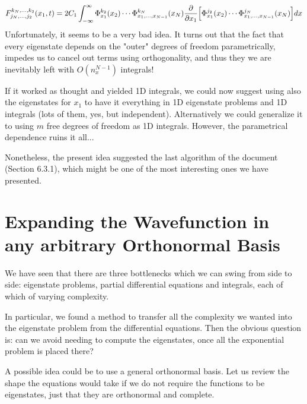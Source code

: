\documentclass[11pt, a4paper]{article} %
\begin{document}
\begin{equation}
F^{k_N,...,k_2}_{j_N,...,j_2}(x_1,t)=2C_1\int_{-\infty}^{\infty}\Phi^{k_2}_{x_1}(x_2) \cdots \Phi^{k_N}_{x_1,... ,x_{N-1}}(x_N) \pdv{}{x_1}\qty[\Phi^{j_2}_{x_1}(x_2) \cdots \Phi^{j_N}_{x_1,... ,x_{N-1}}(x_N)]dx
\end{equation}
Unfortunately, it seems to be a very bad idea. It turns out that the fact that every eigenstate depends on the "outer" degrees of freedom parametrically, impedes us to cancel out terms using orthogonality, and thus they we are inevitably left with $O(n_x^{N-1})$ integrals!

If it worked as thought and yielded 1D integrals, we could now suggest using also the eigenstates for $x_1$ to have it everything in 1D eigenstate problems and 1D integrals (lots of them, yes, but independent). Alternatively we could generalize it to using $m$ free degrees of freedom as 1D integrals. However, the parametrical dependence ruins it all...

Nonetheless, the present idea suggested the last algorithm of the document (Section 6.3.1), which might be one of the most interesting ones we have presented.


\newpage
\section{Expanding the Wavefunction in any arbitrary Orthonormal Basis}
We have seen that there are three bottlenecks which we can swing from side to side: eigenstate problems, partial differential equations and integrals, each of which of varying complexity. 

In particular, we found a method to transfer all the complexity we wanted into the eigenstate problem from the differential equations. Then the obvious question is: can we avoid needing to compute the eigenstates, once all the exponential problem is placed there? 

A possible idea could be to use a general orthonormal basis. Let us review the shape the equations would take if we do not require the functions to be eigenstates, just that they are orthonormal and complete.
\end{document}
